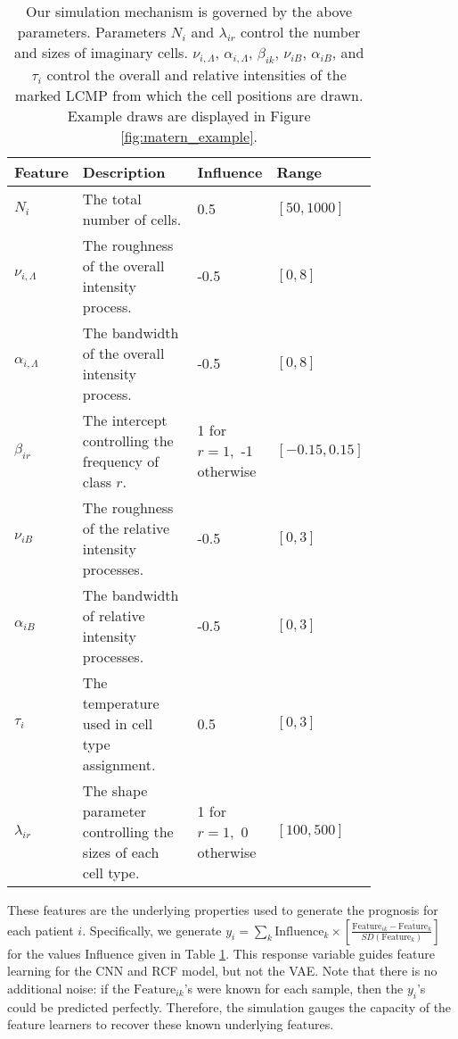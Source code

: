 \begin{table}[]
\begin{tabular}{|p{0.1\linewidth}|p{0.4\linewidth}|p{0.16\linewidth}|p{0.15\linewidth}|}
\hline
\textbf{Feature}              & \textbf{Description}                                 & \textbf{Influence}          & \textbf{Range}             \\
\hline
$N_i$                & The total number of cells.                                    & 0.5                         & $\left[50, 1000\right]$    \\
\hline
$\nu_{i,\Lambda}$    & The roughness of the overall intensity process.            & -0.5                        & $\left[0, 8\right]$        \\
\hline
$\alpha_{i,\Lambda}$ & The bandwidth of the overall intensity process.            & -0.5                        & $\left[0, 8\right]$        \\
\hline
$\beta_{ir}$             & The intercept controlling the frequency of class $r$. & 1 for $r = 1$,\ -1 otherwise & $\left[-0.15, 0.15\right]$ \\
\hline
$\nu_{iB}$           & The roughness of the relative intensity processes.            & -0.5                        & $\left[0, 3\right]$        \\
\hline
$\alpha_{iB}$        & The bandwidth of relative intensity processes.                & -0.5                        & $\left[0, 3\right]$        \\
\hline
$\tau_{i}$           & The temperature used in cell type assignment.                 & 0.5                         & $\left[0, 3\right]$        \\
\hline
$\lambda_{ir}$       & The shape parameter controlling the sizes of each cell type.  & 1 for $r = 1$,\ 0 otherwise  & $\left[100, 500\right]$   \\
\hline
\end{tabular}
\caption{Our simulation mechanism is governed by the above parameters.
  Parameters $N_i$ and $\lambda_{ir}$ control the number and sizes of imaginary
  cells. $\nu_{i, \Lambda}$, $\alpha_{i, \Lambda}$, $\beta_{ik}$, $\nu_{iB}$,
  $\alpha_{iB}$, and $\tau_{i}$ control the overall and relative intensities of
  the marked LCMP from which the cell positions are drawn. Example draws are
  displayed in Figure \ref{fig:matern_example}.}
\label{tab:sim_params}
\end{table}

These features are the underlying properties used to generate the prognosis for
each patient $i$. Specifically, we generate $y_i = \sum_{k} \text{Influence}_{k}
\times \left[\frac{\text{Feature}_{ik} - \overline{\text{Feature}}_{k}}{SD\left(\text{Feature}_{k}\right)}\right]$
for the values Influence given in Table \ref{tab:sim_params}. This response
variable guides feature learning for the CNN and RCF model, but not the VAE.
Note that there is no additional noise: if the $\text{Feature}_{ik}$'s were
known for each sample, then the $y_{i}$'s could be predicted perfectly.
Therefore, the simulation gauges the capacity of the feature learners to recover
these known underlying features.

